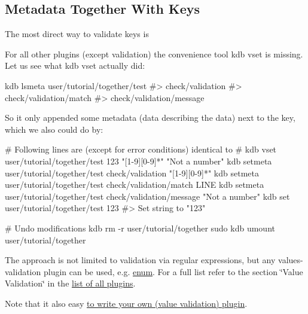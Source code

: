 \subsection*{Metadata Together With Keys}

The most direct way to validate keys is




For all other plugins (except {\ttfamily validation}) the convenience tool {\ttfamily kdb vset} is missing. Let us see what {\ttfamily kdb vset} actually did\+:


\begin{DoxyCode}
kdb lsmeta user/tutorial/together/test
#> check/validation
#> check/validation/match
#> check/validation/message
\end{DoxyCode}


So it only appended some metadata (data describing the data) next to the key, which we also could do by\+:


\begin{DoxyCode}
# Following lines are (except for error conditions) identical to
# kdb vset user/tutorial/together/test 123 "[1-9][0-9]*" "Not a number"
kdb setmeta user/tutorial/together/test check/validation "[1-9][0-9]*"
kdb setmeta user/tutorial/together/test check/validation/match LINE
kdb setmeta user/tutorial/together/test check/validation/message "Not a number"
kdb set user/tutorial/together/test 123
#> Set string to "123"

# Undo modifications
kdb rm -r user/tutorial/together
sudo kdb umount user/tutorial/together
\end{DoxyCode}


The approach is not limited to validation via regular expressions, but any values-\/validation plugin can be used, e.\+g. \hyperlink{md_src_plugins_enum_README_src_plugins_enum_README_md}{enum}. For a full list refer to the section \char`\"{}\+Value Validation\char`\"{} in the \hyperlink{md_src_plugins_README_src_plugins_README_md}{list of all plugins}.

Note that it also easy \hyperlink{doc_tutorials_plugins_md}{to write your own (value validation) plugin}.

